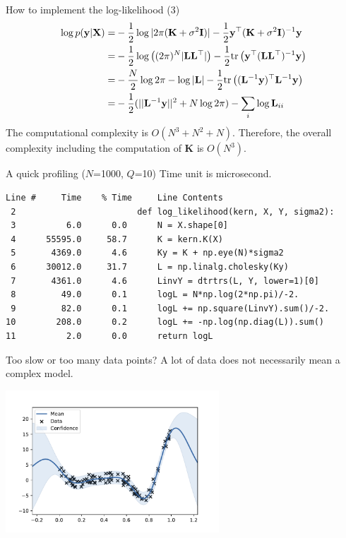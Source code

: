 \documentclass[14pt,aspectratio=1610]{beamer}
\newcommand{\yV}{\mathbf{y}}
\newcommand{\xM}{\mathbf{X}}
\newcommand{\K}{\mathbf{K}}
\renewcommand{\L}{\mathbf{L}}
\newcommand{\I}{\mathbf{I}}
\begin{document}
\begin{frame}{How to implement the log-likelihood (3)}
\begin{align*}
\log p(\yV|\xM) =& -\frac{1}{2}\log |2\pi (\K+\sigma^2\I)| - \frac{1}{2} \yV^\top (\K+\sigma^2\I)^{-1} \yV\\
=& -\frac{1}{2}\log \left((2\pi)^N |\L\L^\top|\right) - \frac{1}{2} \tr{\yV^\top (\L\L^\top)^{-1} \yV} \\
=& -\frac{N}{2}\log 2\pi  -\log  |\L|- \frac{1}{2} \tr{(\L^{-1}\yV)^\top \L^{-1}\yV} \\
=& -\frac{1}{2}(||\L^{-1}\yV||^2+N\log 2\pi)-\sum_i \log \L_{ii}
\end{align*}
The computational complexity is $O(N^3 + N^2 + N)$. Therefore, the overall complexity including the computation of $\K$ is $O(N^3)$.
\end{frame}

\begin{frame}[fragile]{A quick profiling ($N$=1000, $Q$=10)}
Time unit is microsecond.
\small
\begin{verbatim}
Line #     Time    % Time     Line Contents
 2                        def log_likelihood(kern, X, Y, sigma2):
 3          6.0      0.0      N = X.shape[0]
 4      55595.0     58.7      K = kern.K(X)
 5       4369.0      4.6      Ky = K + np.eye(N)*sigma2
 6      30012.0     31.7      L = np.linalg.cholesky(Ky)
 7       4361.0      4.6      LinvY = dtrtrs(L, Y, lower=1)[0]
 8         49.0      0.1      logL = N*np.log(2*np.pi)/-2.
 9         82.0      0.1      logL += np.square(LinvY).sum()/-2.
10        208.0      0.2      logL += -np.log(np.diag(L)).sum()
11          2.0      0.0      return logL
\end{verbatim}
\end{frame}

\begin{frame}{Too slow or too many data points?}
A lot of data does not necessarily mean a complex model.
\begin{center}
\includegraphics[width=0.6\textwidth]{gp_example_lots_data.pdf} 
\end{center}
\end{frame}
\end{document}
